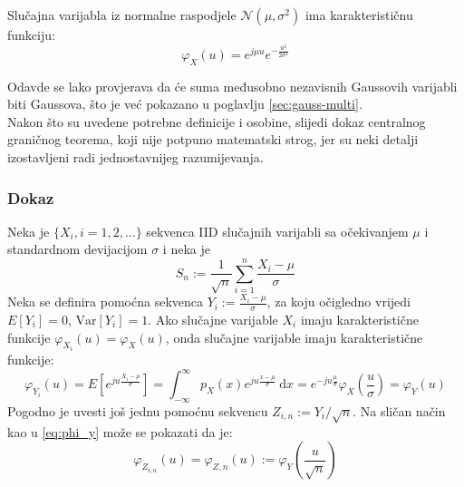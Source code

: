 \begin{property}
  Slučajna varijabla iz normalne raspodjele $\mathcal{N}(\mu, \sigma^2)$ ima
  karakterističnu funkciju:
  \begin{equation} \label{eq:char-norm}
    \varphi_X(u) = e^{j\mu u} e^{-\frac{u^2}{2\sigma^2}}
  \end{equation}
\end{property}

Odavde se lako provjerava da će suma međusobno nezavisnih Gaussovih varijabli
biti Gaussova, što je već pokazano u poglavlju \ref{sec:gauss-multi}. \\

Nakon što su uvedene potrebne definicije i osobine, slijedi dokaz centralnog
graničnog teorema, koji nije potpuno matematski strog, jer su neki detalji
izostavljeni radi jednostavnijeg razumijevanja. \\

\subsubsection{Dokaz}

Neka je $\{X_i, i=1,2,...\}$ sekvenca IID slučajnih varijabli sa očekivanjem
$\mu$ i standardnom devijacijom $\sigma$ i neka je
\begin{equation}
  S_n := \frac{1}{\sqrt{n}} \sum_{i=1}^{n} \frac{X_i-\mu}{\sigma}
\end{equation}
Neka se definira pomoćna sekvenca $Y_i := \frac{X_i-\mu}{\sigma}$, za koju
očigledno vrijedi $E[Y_i] = 0$, $\text{Var}[Y_i] = 1$. Ako slučajne varijable
$X_i$ imaju karakteristične funkcije $\varphi_{X_i}(u) = \varphi_X(u)$, onda
slučajne varijable imaju karakteristične funkcije:
\begin{equation} \label{eq:phi_y}
  \varphi_{Y_i}(u) = E\left[e^{ju\frac{X_i-\mu}{\sigma}}\right]
  = \int_{-\infty}^{\infty} p_X(x)e^{ju\frac{x-\mu}{\sigma}} \ \mathrm dx
  = e^{-ju\frac{\mu}{\sigma}} \varphi_X\left(\frac{u}{\sigma}\right)
  = \varphi_Y(u)
\end{equation}
Pogodno je uvesti još jednu pomoćnu sekvencu $Z_{i,n} := Y_i/\sqrt{n}$. Na
sličan način kao u \eqref{eq:phi_y} može se pokazati da je:
\begin{equation}
  \varphi_{Z_{i,n}}(u)
  = \varphi_{Z,n}(u) := \varphi_Y\left(\frac{u}{\sqrt{n}}\right)
\end{equation}

